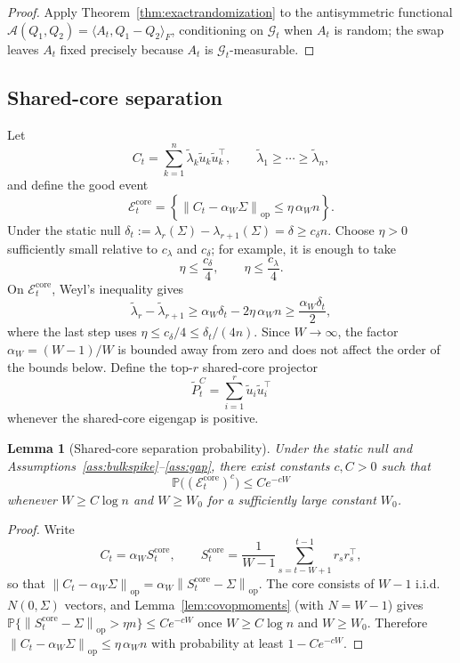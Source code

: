 \documentclass[11pt]{article}
\theoremstyle{tightplain}
\newtheorem{lemma}[theorem]{Lemma}
\theoremstyle{tightdef}
\DeclareMathOperator{\op}{op}
\newcommand{\Prob}{\mathbb P}
\newcommand{\norm}[1]{\left\lVert #1 \right\rVert}
\begin{document}
\begin{proof}
Apply Theorem~\ref{thm:exactrandomization} to the antisymmetric functional
$\mathcal A(Q_1,Q_2)=\langle A_t,Q_1-Q_2\rangle_F$, conditioning on
$\mathcal G_t$ when $A_t$ is random; the swap leaves $A_t$ fixed precisely
because $A_t$ is $\mathcal G_t$-measurable.
\end{proof}

\subsection{Shared-core separation}

Let
\[
C_t=\sum_{k=1}^n\widetilde\lambda_k\widetilde u_k\widetilde u_k^\top,
\qquad
\widetilde\lambda_1\ge\cdots\ge\widetilde\lambda_n,
\]
and define the good event
\[
\mathcal E_t^{\mathrm{core}}
=\left\{\norm{C_t-\alpha_W\Sigma}_{\op}\le \eta\,\alpha_W n\right\}.
\]
Under the static null $\delta_t:=\lambda_r(\Sigma)-\lambda_{r+1}(\Sigma)=\delta\ge c_\delta n$.
Choose $\eta>0$ sufficiently small relative to $c_\lambda$ and $c_\delta$; for
example, it is enough to take
\[
\eta\le\frac{c_\delta}{4},
\qquad
\eta\le\frac{c_\lambda}{4}.
\]
On $\mathcal E_t^{\mathrm{core}}$, Weyl's inequality \cite[Ch.~III]{Bhatia1997}
gives
\[
\widetilde\lambda_r-\widetilde\lambda_{r+1}
\ge
\alpha_W\delta_t-2\eta\,\alpha_W n
\ge
\frac{\alpha_W\delta_t}{2},
\]
where the last step uses $\eta\le c_\delta/4\le \delta_t/(4n)$. Since
$W\to\infty$, the factor $\alpha_W=(W-1)/W$ is bounded away from zero and does
not affect the order of the bounds below. Define the top-$r$ shared-core
projector
\[
\widetilde P_t^C
=\sum_{i=1}^r \widetilde u_i\widetilde u_i^\top
\]
whenever the shared-core eigengap is positive.

\begin{lemma}[Shared-core separation probability]\label{lem:sharedcoreevent}
Under the static null and Assumptions~\ref{ass:bulkspike}--\ref{ass:gap}, there
exist constants $c,C>0$ such that
\[
\Prob\bigl((\mathcal E_t^{\mathrm{core}})^c\bigr)\le Ce^{-cW}
\]
whenever $W\ge C\log n$ and $W\ge W_0$ for a sufficiently large constant $W_0$.
\end{lemma}

\begin{proof}
Write
\[
C_t=\alpha_W S_t^{\mathrm{core}},
\qquad
S_t^{\mathrm{core}}=\frac1{W-1}\sum_{s=t-W+1}^{t-1}r_s r_s^\top,
\]
so that
$\norm{C_t-\alpha_W\Sigma}_{\op}=\alpha_W\norm{S_t^{\mathrm{core}}-\Sigma}_{\op}$.
The core consists of $W-1$ i.i.d.\ $N(0,\Sigma)$ vectors, and
Lemma~\ref{lem:covopmoments} (with $N=W-1$) gives
$\Prob\{\norm{S_t^{\mathrm{core}}-\Sigma}_{\op}>\eta n\}\le Ce^{-cW}$ once
$W\ge C\log n$ and $W\ge W_0$. Therefore
$\norm{C_t-\alpha_W\Sigma}_{\op}\le\eta\,\alpha_W n$ with probability at least
$1-Ce^{-cW}$.
\end{proof}
\end{document}
